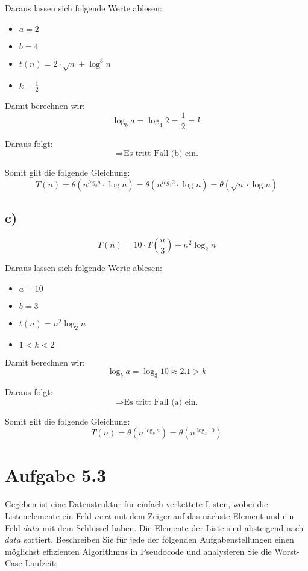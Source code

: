 \documentclass[a4paper]{article}
\begin{document}
Daraus lassen sich folgende Werte ablesen:
\begin{itemize}
    \item $a = 2$
    \item $b = 4$
    \item $t(n) = 2 \cdot \sqrt{n} + \log^3 n$
    \item $k = \frac{1}{2}$
\end{itemize}

Damit berechnen wir:
\[ \log_b a = \log_4 2 = \frac{1}{2} = k \]

Daraus folgt:
\[
\Rightarrow \text{Es tritt Fall (b) ein.}
\]

Somit gilt die folgende Gleichung:
\[ T(n) = \theta\left(n^{log_b a} \cdot \log n\right) = \theta\left(n^{log_4 2} \cdot \log n\right) = \theta\left(\sqrt{n} \cdot \log n\right)\]



\subsection*{c)}
\[ T(n) = 10 \cdot T\left(\frac{n}{3}\right) + n^2\log_2n \]

Daraus lassen sich folgende Werte ablesen:
\begin{itemize}
    \item $a = 10$
    \item $b = 3$
    \item $t(n) = n^2\log_2n$
    \item $1 < k < 2$
\end{itemize}

Damit berechnen wir:
\[ \log_b a = \log_3 10 \approx 2.1 > k \]

Daraus folgt:
\[
\Rightarrow \text{Es tritt Fall (a) ein.}
\]

Somit gilt die folgende Gleichung:
\[ T(n) = \theta\left(n^{\log_{b}a}\right) = \theta\left(n^{\log_{3}10}\right)\]

\break

\section*{Aufgabe 5.3}
Gegeben ist eine Datenstruktur für einfach verkettete Listen, wobei die Listenelemente ein Feld $next$
mit dem Zeiger auf das nächste Element und ein Feld $data$ mit dem Schlüssel haben. Die Elemente der
Liste sind absteigend nach $data$ sortiert. Beschreiben Sie für jede der folgenden Aufgabenstellungen
einen möglichst effizienten Algorithmus in Pseudocode und analysieren Sie die Worst-Case Laufzeit:
\end{document}
